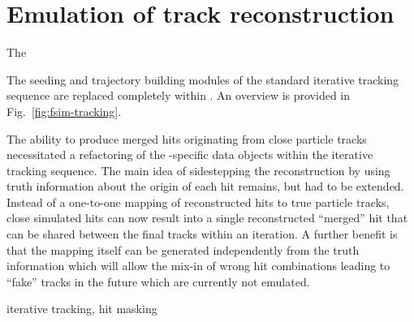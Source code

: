 \section{Emulation of track reconstruction}
\label{sec:fsim-tracking}

The 


The seeding and trajectory building modules of the standard iterative tracking sequence are replaced completely within \FSIM. An overview is provided in Fig.~\ref{fig:fsim-tracking}. 


The ability to produce merged hits originating from close particle tracks necessitated a refactoring of the \FSIM{}-specific data objects within the iterative tracking sequence. The main idea of sidestepping the reconstruction by using truth information about the origin of each hit remains, but had to be extended. Instead of a one-to-one mapping of reconstructed hits to true particle tracks, close simulated hits can now result into a single reconstructed ``merged'' hit that can be shared between the final tracks within an iteration. A further benefit is that the mapping itself can be generated independently from the truth information which will allow the mix-in of wrong hit combinations leading to ``fake'' tracks in the future which are currently not emulated.


iterative tracking, hit masking



